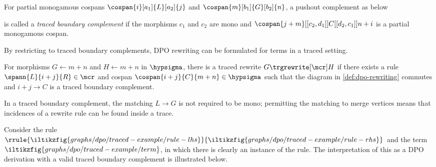 \begin{definition}
    \label{def:traced-boundary-complement}
    For partial monogamous cospans \(
    \cospan{i}[a_1]{L}[a_2]{j}
    \) and \(
    \cospan{m}[b_1]{G}[b_2]{n}
    \), a pushout complement as below
    \begin{center}
    \end{center}
    is called a \emph{traced boundary complement} if the morphisms \(c_1\) and
    \(c_2\) are mono and \(
    \cospan{j + m}[[c_2,d_1]]{C}[[d_2,c_1]]{n + i}
    \) is a partial monogamous cospan.
\end{definition}

By restricting to traced boundary complements, DPO rewriting can be formulated
for terms in a traced setting.

\begin{definition}
    For morphisms \(G \leftarrow m + n\) and \(H \leftarrow m + n\) in
    \(\hypsigma\), there is a traced rewrite \(G \trgrewrite[\mcr] H\) if there
    exists a rule \(
    \spann{L}{i + j}{R} \in \mcr
    \) and cospan \(
    \cospan{i + j}{C}{m + n} \in \hypsigma
    \) such that the diagram in \cref{def:dpo-rewriting} commutes and \(i + j \to C\)
    is a traced boundary complement.
\end{definition}

In a traced boundary complement, the matching \(L \to G\) is not required to
be mono; permitting the matching to merge vertices means that incidences of a
rewrite rule can be found inside a trace.

\begin{example}
    Consider the rule \(
    \rrule{
        \iltikzfig{graphs/dpo/traced-example/rule-lhs}
    }{
        \iltikzfig{graphs/dpo/traced-example/rule-rhs}
    }
    \) and the term \(
    \iltikzfig{graphs/dpo/traced-example/term}
    \), in which there is clearly an instance of the rule.
    The interpretation of this as a DPO derivation with a valid traced boundary
    complement is illustrated below.
    \begin{center}
        
    \end{center}
\end{example}


